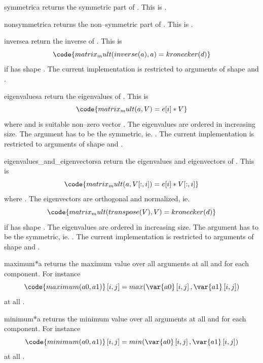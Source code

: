 \begin{funcdesc}{symmetric}{a}
returns the symmetric part of . This is .
\end{funcdesc}
\begin{funcdesc}{nonsymmetric}{a}
returns the non--symmetric part of . This is .
\end{funcdesc}
\begin{funcdesc}{inverse}{a}
return the inverse of . This is 
\begin{equation}
\code{matrix_mult(inverse(a),a)=kronecker(d)}
\end{equation} 
if  has shape . The current implementation is restricted to arguments of shape 
 and .
\end{funcdesc}
\begin{funcdesc}{eigenvalues}{a}
return the eigenvalues of . This is 
\begin{equation}
\code{matrix_mult(a,V)=e[i]*V}
\end{equation} 
where  and  is suitable non--zero vector . 
The eigenvalues are ordered in increasing size.
The argument  has to be the symmetric, ie. .  
The current implementation is restricted to arguments of shape 
 and .
\end{funcdesc}
\begin{funcdesc}{eigenvalues_and_eigenvectors}{a}
return the eigenvalues and eigenvectors of . This is 
\begin{equation}
\code{matrix_mult(a,V[:,i])=e[i]*V[:,i]}
\end{equation} 
where . The eigenvectors  are orthogonal and normalized, ie.
\begin{equation}
\code{matrix_mult(transpose(V),V)=kronecker(d)}
\end{equation} 
if  has shape . The eigenvalues are ordered in increasing size.
The argument  has to be the symmetric, ie. .  
The current implementation is restricted to arguments of shape 
 and .
\end{funcdesc}
\begin{funcdesc}{maximum}{*a}
returns the maximum value over all arguments at all \DataSamplePoints and for each component.
For instance 
\begin{equation}
\code{maximum(a0,a1)}\left[i,j\right]=max(\var{a0} \left[i,j\right],\var{a1} \left[i,j\right])
\end{equation}
at all \DataSamplePoints.
\end{funcdesc}
\begin{funcdesc}{minimum}{*a}
returns the minimum value over all arguments at all \DataSamplePoints and for each component.
For instance 
\begin{equation}
\code{minimum(a0,a1)}\left[i,j\right]=min(\var{a0} \left[i,j\right],\var{a1} \left[i,j\right])
\end{equation}
at all \DataSamplePoints.
\end{funcdesc}

